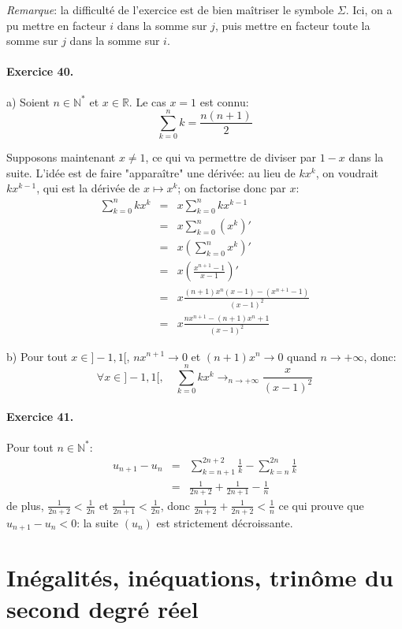 \documentclass[a4paper,11pt]{article}
\begin{document}
\textit{Remarque}: la difficulté de l'exercice est de bien maîtriser le symbole $\Sigma$. Ici, on a pu mettre en facteur $i$ dans la somme sur $j$, puis mettre en facteur toute la somme sur $j$ dans la somme sur $i$.
\paragraph{Exercice 40.} a) Soient $n\in\mathbb{N}^*$ et $x\in\mathbb{R}$. Le cas $x=1$ est connu:
\[
\sum_{k=0}^n{k} = \frac{n(n+1)}{2}
\]

Supposons maintenant $x\neq 1$, ce qui va permettre de diviser par $1-x$ dans la suite. L’idée est de faire "apparaître" une dérivée: au lieu de $kx^k$, on voudrait $kx^{k-1}$, qui est la dérivée de $x\mapsto x^{k}$; on factorise donc par $x$:
\begin{eqnarray}
\sum_{k=0}^n{kx^k} &=& x\sum_{k=0}^n{kx^{k-1}} \nonumber \\
 &=& x\sum_{k=0}^n{\left( x^k \right)'} \nonumber \\
  &=& x \left( \sum_{k=0}^n{ x^k }\right)' \nonumber \\
  &=& x \left( \frac{x^{n+1}-1}{x-1} \right)' \nonumber \\
  &=& x \frac{(n+1)x^n(x-1)-(x^{n+1}-1)}{(x-1)^2} \nonumber \\
  &=& x \frac{nx^{n+1}-(n+1)x^n+1}{(x-1)^2} \nonumber
\end{eqnarray}

b) Pour tout $x\in ]-1,1[$, $nx^{n+1}\to 0$ et $(n+1)x^n\to 0$ quand $n\to+\infty$, donc:
\[
\forall x\in ]-1,1[, \quad \sum_{k=0}^n{kx^k} \mathop{\to}_{n\to +\infty} \frac{x}{(x-1)^2}
\]

\paragraph{Exercice 41.} Pour tout $n\in \mathbb{N}^*$:
\begin{eqnarray}
  u_{n+1}-u_n &=& \sum_{k=n+1}^{2n+2}{\frac{1}{k}} - \sum_{k=n}^{2n}{\frac{1}{k}} \nonumber \\
       &=& \frac{1}{2n+2} + \frac{1}{2n+1} - \frac{1}{n} \nonumber 
\end{eqnarray}
de plus, $ \frac{1}{2n+2} < \frac{1}{2n}$ et $ \frac{1}{2n+1} < \frac{1}{2n}$, donc $\frac{1}{2n+2} + \frac{1}{2n+2} < \frac{1}{n}$ ce qui prouve que $u_{n+1}-u_n<0$: la suite $(u_n)$ est strictement décroissante.
\section{Inégalités, inéquations, trinôme du second degré réel}
\end{document}
